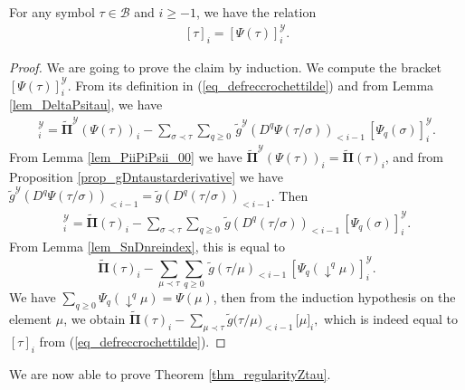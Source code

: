 \documentclass[11pt]{preprint}
\newcommand{\mcB}{\mathcal{B}}
\newcommand{\mcY}{\mathcal{Y}}
\def\PPi{\boldsymbol{\Pi}}
\def\eqref#1{(\ref{#1})}
\begin{document}
	\begin{lemma}\label{lem_sumcrochets}
		For any symbol $\tau\in\mcB$ and $i\geq-1$, we have the relation
		\begin{equation}\begin{split}\label{eq_propdecompencrochet}
				[\tau]_i = \left[ \Psi(\tau) \right]_i^\mathcal{Y}.
		\end{split}\end{equation}    
	\end{lemma}
	
	\begin{proof}
		We are going to prove the claim by induction.
		We compute the bracket $[\Psi(\tau)]_i^\mcY$. From its definition in \eqref{eq_defreccrochettilde} and from Lemma \ref{lem_DeltaPsitau}, we have
		\begin{align*}
			[\Psi(\tau)]_i^\mcY = \widetilde{\PPi}^\mcY\left(\Psi(\tau)\right)_i - \sum_{\sigma\prec\tau}\sum_{q\geq 0}\, \widetilde{ g }^\mcY\left(D^q\Psi(\tau/\sigma) \right)_{<i-1} \, \left[ \Psi_q(\sigma)  \right]_i^\mcY.
		\end{align*}
		From Lemma \ref{lem_PiiPiPsii_00} we have $\widetilde{\PPi}^\mcY\left(\Psi(\tau)\right)_i=\widetilde{\PPi}\left(\tau\right)_i$, and from Proposition \ref{prop_gDntaustarderivative} we have $\widetilde{ g }^\mcY\left(D^q\Psi(\tau/\sigma)\right)_{<i-1}=\widetilde{ g }\left(D^q(\tau/\sigma)\right)_{<i-1}$. Then 
		\begin{align*}
			[\Psi(\tau)]_i^\mcY = \widetilde{\PPi}\left(\tau\right)_i - \sum_{\sigma\prec\tau}\sum_{q\geq 0}\, \widetilde{ g }\left(D^q(\tau/\sigma) \right)_{<i-1} \, \left[ \Psi_q(\sigma)  \right]_i^\mcY.
		\end{align*}
		From Lemma \ref{lem_SnDnreindex}, this is equal to 
		$$
		\widetilde{\PPi}\left(\tau\right)_i - \sum_{\mu\prec\tau}\sum_{q\geq 0}\, \widetilde{g}\left(\tau/\mu \right)_{<i-1} \, \left[ \Psi_q(\downarrow^q\mu)  \right]_i^\mcY.
		$$
		We have $\sum_{q\geq 0} \Psi_q(\downarrow^q\mu)=\Psi(\mu)$, then from the induction hypothesis on the element $\mu$, we obtain
			$
			\widetilde{ \PPi}(\tau)_i - \sum_{\mu\prec\tau}  \widetilde{ g}\big(\tau/\mu \big)_{<i-1} \, \big[ \mu \big]_i,
		$
		which is indeed equal to $[\tau]_i$ from \eqref{eq_defreccrochettilde}.
	\end{proof}
	
	We are now able to prove Theorem \ref{thm_regularityZtau}.
	
\end{document}
